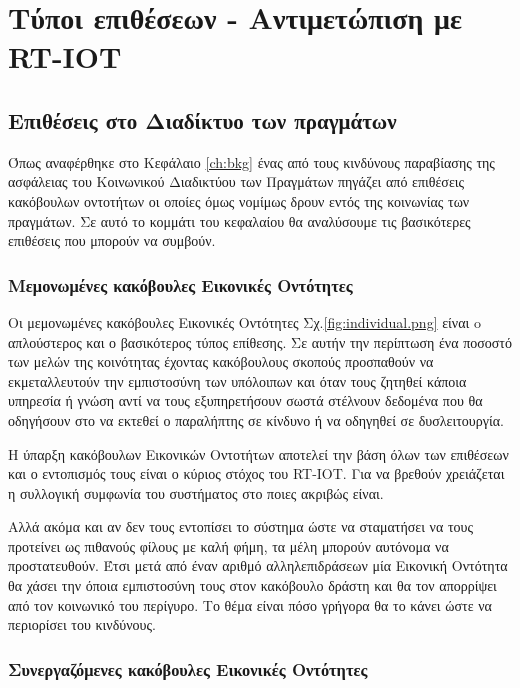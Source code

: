 \chapter{Τύποι επιθέσεων - Αντιμετώπιση με RT-IOT}\label{ch:design}

\section{Επιθέσεις στο Διαδίκτυο των πραγμάτων}

Όπως αναφέρθηκε στο Κεφάλαιο \ref{ch:bkg} ένας από τους κινδύνους παραβίασης της ασφάλειας του Κοινωνικού Διαδικτύου των Πραγμάτων πηγάζει από επιθέσεις κακόβουλων οντοτήτων οι οποίες όμως νομίμως δρουν εντός της κοινωνίας των πραγμάτων. Σε αυτό το κομμάτι του κεφαλαίου θα αναλύσουμε τις βασικότερες επιθέσεις που μπορούν να συμβούν\cite{GomezMarmol}.

\subsection{Μεμονωμένες κακόβουλες Εικονικές Οντότητες}\label{sec:indv}

Οι μεμονωμένες κακόβουλες Εικονικές Οντότητες Σχ.\ref{fig:individual.png} είναι o απλούστερος και ο βασικότερος τύπος επίθεσης. Σε αυτήν την περίπτωση ένα ποσοστό των μελών της κοινότητας έχοντας κακόβουλους σκοπούς προσπαθούν να εκμεταλλευτούν την εμπιστοσύνη των υπόλοιπων και όταν τους ζητηθεί κάποια υπηρεσία ή γνώση αντί να τους εξυπηρετήσουν σωστά στέλνουν δεδομένα που θα οδηγήσουν στο να εκτεθεί ο παραλήπτης σε κίνδυνο ή να οδηγηθεί σε δυσλειτουργία. 

\newpage
Η ύπαρξη κακόβουλων Εικονικών Οντοτήτων αποτελεί την βάση όλων των επιθέσεων και ο εντοπισμός τους είναι ο κύριος στόχος του RT-IOT. Για να βρεθούν χρειάζεται η συλλογική συμφωνία του συστήματος στο ποιες ακριβώς είναι.

Αλλά ακόμα και αν δεν τους εντοπίσει το σύστημα ώστε να σταματήσει να τους προτείνει ως πιθανούς φίλους με καλή φήμη, τα μέλη μπορούν αυτόνομα να προστατευθούν. Έτσι μετά από έναν αριθμό αλληλεπιδράσεων μία Εικονική Οντότητα θα χάσει την όποια εμπιστοσύνη τους στον κακόβουλο δράστη και θα τον απορρίψει από τον κοινωνικό του περίγυρο. Το θέμα είναι πόσο γρήγορα θα το κάνει ώστε να περιορίσει του κινδύνους.



\subsection{Συνεργαζόμενες κακόβουλες Εικονικές Οντότητες}\label{sec:col}

